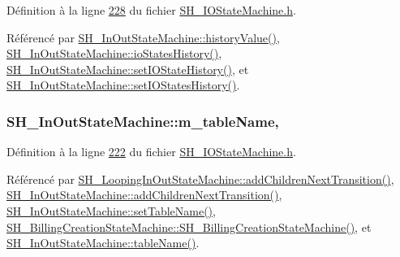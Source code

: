 Définition à la ligne \hyperlink{SH__IOStateMachine_8h_source_l00228}{228} du fichier \hyperlink{SH__IOStateMachine_8h_source}{S\-H\-\_\-\-I\-O\-State\-Machine.\-h}.



Référencé par \hyperlink{classSH__InOutStateMachine_af71bfdb3b59b7bf2763588b513b4205f}{S\-H\-\_\-\-In\-Out\-State\-Machine\-::history\-Value()}, \hyperlink{classSH__InOutStateMachine_a13889998c6dcd17db984dd6ed1454e80}{S\-H\-\_\-\-In\-Out\-State\-Machine\-::io\-States\-History()}, \hyperlink{classSH__InOutStateMachine_acbcce2c4300af1634d928b30e5e9be1c}{S\-H\-\_\-\-In\-Out\-State\-Machine\-::set\-I\-O\-State\-History()}, et \hyperlink{classSH__InOutStateMachine_af51f92c37d00a4eec4da42113cfd7d73}{S\-H\-\_\-\-In\-Out\-State\-Machine\-::set\-I\-O\-States\-History()}.

\hypertarget{classSH__InOutStateMachine_aa009eecc5ab6181358faafb5996b6006}{
\subsubsection[{m\-\_\-table\-Name}]{\setlength{\rightskip}{0pt plus 5cm}S\-H\-\_\-\-In\-Out\-State\-Machine\-::m\-\_\-table\-Name\hspace{0.3cm}{\ttfamily [protected]}, {\ttfamily [inherited]}}}\label{classSH__InOutStateMachine_aa009eecc5ab6181358faafb5996b6006}


Définition à la ligne \hyperlink{SH__IOStateMachine_8h_source_l00222}{222} du fichier \hyperlink{SH__IOStateMachine_8h_source}{S\-H\-\_\-\-I\-O\-State\-Machine.\-h}.



Référencé par \hyperlink{classSH__LoopingInOutStateMachine_abfae9f47019379f270496de46845c729}{S\-H\-\_\-\-Looping\-In\-Out\-State\-Machine\-::add\-Children\-Next\-Transition()}, \hyperlink{classSH__InOutStateMachine_aa78420f8778d7777809aad77eb8473b4}{S\-H\-\_\-\-In\-Out\-State\-Machine\-::add\-Children\-Next\-Transition()}, \hyperlink{classSH__InOutStateMachine_a95db31a7e7f31f36a8737adc739ab08c}{S\-H\-\_\-\-In\-Out\-State\-Machine\-::set\-Table\-Name()}, \hyperlink{classSH__BillingCreationStateMachine_ad62b77fa4aeafe200056ff3974562f83}{S\-H\-\_\-\-Billing\-Creation\-State\-Machine\-::\-S\-H\-\_\-\-Billing\-Creation\-State\-Machine()}, et \hyperlink{classSH__InOutStateMachine_a4288a6c86ddf83effefff886675591c9}{S\-H\-\_\-\-In\-Out\-State\-Machine\-::table\-Name()}.



